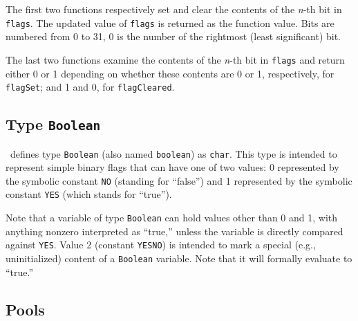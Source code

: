 The first two functions respectively set and clear
the contents of the {\em n\/}-th bit in {\tt flags}.
The updated value of {\tt flags} is returned as the function value.
Bits are numbered from 0 to
31, 0 is the number of the rightmost (least significant) bit.

The last two
functions examine the contents of the {\em n\/}-th bit in {\tt flags} and return
either 0 or 1 depending on whether these contents are 0 or 1,
respectively, for {\tt flagSet}; and 1 and 0, for {\tt flagCleared}.

\subsection{Type {\tt Boolean}}
\label{rm_au_tb}

\smurph\ defines type {\tt Boolean} (also named {\tt boolean}) as {\tt char}.
This type is intended to represent simple binary flags that can have one
of two values: 0 represented by the symbolic constant {\tt NO} (standing for
``false'') and 1 represented by the symbolic constant {\tt YES} (which stands
for ``true'').

Note that a variable of type {\tt Boolean} can hold values other than 0 and 1,
with anything nonzero interpreted as ``true,'' unless the variable is directly
compared against {\tt YES}.
Value 2 (constant {\tt YESNO}) is intended to mark a special (e.g.,
uninitialized)
content of a {\tt Boolean} variable.
Note that it will formally evaluate to ``true.''

\subsection{Pools}
\label{rm_au_po}


